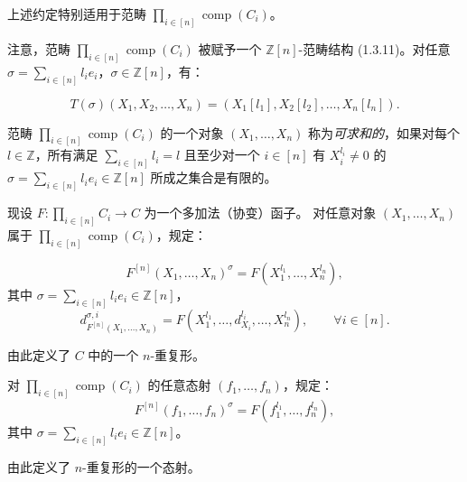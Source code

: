 \clearpage
{}%
上述约定特别适用于范畴
$\prod_{i\in[n]}\operatorname{comp}(C_i)$。

注意，范畴
$\prod_{i\in[n]}\operatorname{comp}(C_i)$ 被赋予一个
$\mathbb Z[n]$-范畴结构 (1.3.11)。对任意
$\sigma=\sum_{i\in[n]}l_i e_i$，$\sigma\in\mathbb Z[n]$，有：

\begin{equation}
  T(\sigma)(X_1,X_2,\ldots,X_n)
  = (X_1[l_1],X_2[l_2],\ldots,X_n[l_n]).
  \tag{2.4.2.1}
\end{equation}

范畴 $\prod_{i\in[n]}\operatorname{comp}(C_i)$ 的一个对象
$(X_1,\ldots,X_n)$ 称为\emph{可求和的}，如果对每个
$l\in\mathbb Z$，所有满足
$\sum_{i\in[n]}l_i=l$ 且至少对一个 $i\in[n]$ 有
$X_i^{l_i}\neq0$ 的
$\sigma=\sum_{i\in[n]}l_i e_i\in\mathbb Z[n]$ 所成之集合是有限的。

现设
$F\colon\prod_{i\in[n]}C_i\longrightarrow C$ 为一个多加法（协变）函子。
对任意对象 $(X_1,\ldots,X_n)$
属于 $\prod_{i\in[n]}\operatorname{comp}(C_i)$，规定：

\begin{equation}
  F^{[n]}(X_1,\ldots,X_n)^\sigma
  =F(X_1^{l_1},\ldots,X_n^{l_n}),
  \tag{2.4.2.2}
\end{equation}
其中 $\sigma=\sum_{i\in[n]}l_i e_i\in\mathbb Z[n]$，
\begin{equation*}
  d^{\sigma,i}_{F^{[n]}(X_1,\ldots,X_n)}
  =F(X_1^{l_1},\ldots,d_{X_i}^{l_i},\ldots,X_n^{l_n}),
  \qquad \forall i\in[n].
\end{equation*}

由此定义了 $C$ 中的一个 $n$-重复形。

对 $\prod_{i\in[n]}\operatorname{comp}(C_i)$ 的任意态射
$(f_1,\ldots,f_n)$，规定：
\begin{equation}
  F^{[n]}(f_1,\ldots,f_n)^\sigma
  =F(f_1^{l_1},\ldots,f_n^{l_n}),
  \tag{2.4.2.3}
\end{equation}
其中 $\sigma=\sum_{i\in[n]}l_i e_i\in\mathbb Z[n]$。

由此定义了 $n$-重复形的一个态射。

